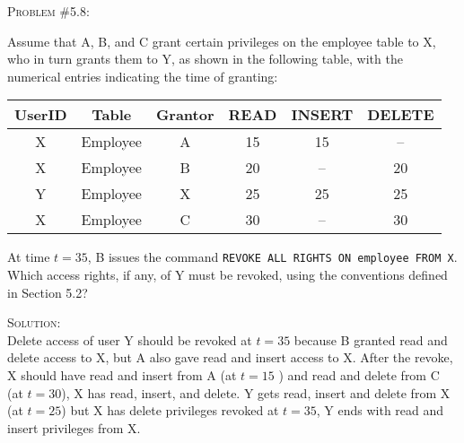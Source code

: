 \documentclass[12pt]{article}
\newenvironment{problem}[1]
{\begin{mdframed}[linewidth=0.8pt]
        \textsc{Problem #1:}

}
    {\end{mdframed}}
\newenvironment{solution}
    {\textsc{Solution:}\\}
    {\newpage}%
\begin{document}
	\begin{problem}{\#5.8}
		Assume that A, B, and C grant certain privileges on the employee table to X, who
		in turn grants them to Y, as shown in the following table, with the numerical
		entries indicating the time of granting:
		\begin{center}
			\begin{tabular}{|c|c|c|c|c|c|}
				\hline
				\textbf{UserID} & \textbf{Table} & \textbf{Grantor} & \textbf{READ} & \textbf{INSERT} & \textbf{DELETE}\\
				\hline
				X & Employee & A & 15 & 15 & --\\
				\hline
				X & Employee & B & 20 & -- & 20\\
				\hline
				Y & Employee & X & 25 & 25 & 25\\
				\hline
				X & Employee & C & 30 & -- & 30\\
				\hline
			\end{tabular}
		\end{center}
		At time $t=35$, B issues the command \verb|REVOKE ALL RIGHTS ON employee FROM X|.
		Which access rights, if any, of Y must be revoked, using the conventions defined
		in Section 5.2?
	\end{problem}
	\begin{solution}
		Delete access of user Y should be revoked at $t=35$ because B granted read and delete access
		to X, but A also gave read and insert access to X. After the revoke, X should have read and
		insert from A (at $t=15$ ) and read and delete from C (at $t=30$), X has read, insert, and
		delete. Y gets read, insert and delete from X (at  $t=25$) but X has delete privileges revoked
		at  $t=35$, Y ends with read and insert privileges from X.
	\end{solution}
\end{document}
